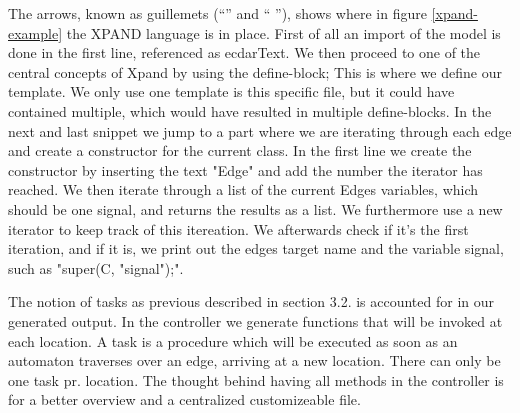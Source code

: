 The arrows, known as guillemets (``\guillemotleft'' and `` \guillemotright''),
shows where in figure \ref{xpand-example} the XPAND language is in place. First
of all an import of the model is done in the first line, referenced as
ecdarText. We then proceed to one of the central concepts of Xpand by using the
define-block; This is where we define our template. We only use one template is
this specific file, but it could have contained multiple, which would have
resulted in multiple define-blocks. In the next and last snippet we jump to a
part where we are iterating through each edge and create a constructor for the
current class. In the first line we create the constructor by inserting the text
"Edge" and add the number the iterator has reached. We then iterate through a
list of the current Edges variables, which should be one signal, and returns the
results as a list. We furthermore use a new iterator to keep track of this
itereation. We afterwards check if it's the first iteration, and if it is, we
print out the edges target name and the variable signal, such as "super(C,
"signal");".

The notion of tasks as previous described in section 3.2. is accounted for in
our generated output. In the controller we generate functions that will be
invoked at each location. A task is a procedure which will be executed as soon
as an automaton traverses over an edge, arriving at a new location. There can
only be one task pr. location. The thought behind having all methods in the
controller is for a better overview and a centralized customizeable file.
